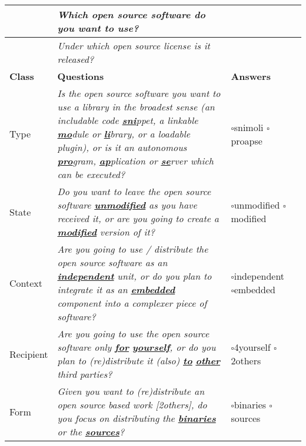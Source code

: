 \begin{small}
\begin{tabular}[h]{|l|l|l|l|}
\hline 
  \ & \textit{Which open source software do you want to use?} & \ \\
\hline 
  \ & \textit{Under which open source license is it released?} & \ \\
\hline
\hline 
\textbf{Class} & \textbf{Questions} & \textbf{Answers}\\
\hline 
\hline 
  Type
  & \parbox[c][2.6cm][c]{10cm}{
    \textit{Is the open source software you want to use a library in the
    broadest sense (an includable code \textbf{\underline{sni}}ppet, a linkable
    \textbf{\underline{mo}}dule or \textbf{\underline{li}}brary, or a loadable
    plugin), or is it an autonomous \textbf{\underline{pro}}gram,
    \textbf{\underline{ap}}plication or \textbf{\underline{se}}rver which can be
    executed?}} & \parbox{7.5em}{
      $\square$\hspace{1em}snimoli\\
      $\square$\hspace{1em}proapse}
    \\
\hline 
  State & 
  \parbox[c][1.6cm][c]{10cm}{
  \textit{Do you want to leave the open source software
  \textbf{\underline{unmodified}} as you have received it, or are you going to
  create a \textbf{\underline{modified}} version of it?}} &
  \parbox{7.5em}{
    $\square$\hspace{1em}unmodified\\
    $\square$\hspace{1em}modified} \\
\hline 
  Context & 
  \parbox[c][1.6cm][c]{10cm}{
  \textit{Are you going to use / distribute the open source software as an
  \textbf{\underline{independent}} unit, or do you plan to integrate it as an
  \textbf{\underline{embedded}} component into a complexer piece of
  software?}} & \parbox{7.5em}{
  $\square$\hspace{1em}independent\\
    $\square$\hspace{1em}embedded}\\
\hline 
  Recipient & 
  \parbox[c][1.6cm][c]{10cm}{ \textit{Are you going to use the open source
  software only \textbf{\underline{for}} \textbf{\underline{yourself}}, or do
  you plan to (re)distribute it (also) \textbf{\underline{to}}
  \textbf{\underline{other}} third parties?}}
  & \parbox{7.5em}{
    $\square$\hspace{1em}4yourself\\
    $\square$\hspace{1em}2others}\\
\hline 
  Form & 
  \parbox[c][1.6cm][c]{10cm}{
  \textit{Given you want to (re)distribute an open source based work [2others],
  do you focus on distributing the \textbf{\underline{binaries}} or the
  \textbf{\underline{sources}}?}}
  & \parbox{7.5em}{
    $\square$\hspace{1em}binaries\\
    $\square$\hspace{1em}sources}\\
\hline 
\hline
\end{tabular}
\end{small}
